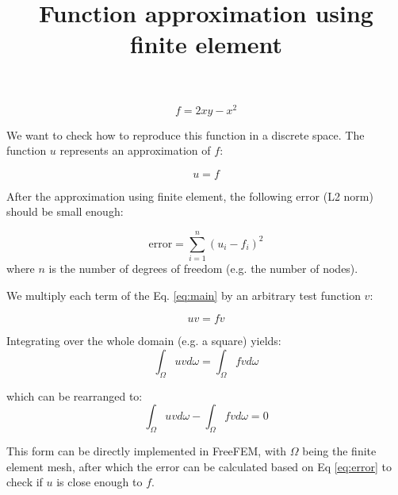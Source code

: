 \documentclass[12pt,a4paper]{article}
\title{Function approximation using finite element}
\date{}
\begin{document}
\maketitle

\onehalfspacing

\begin{equation} 
f=2xy-x^2
\end{equation}

\noindent We want to check how to reproduce this function in a discrete space. The function $u$ represents an approximation of $f$: 

\begin{equation} \label{eq:main}
u=f
\end{equation}

\noindent After the approximation using finite element, the following error (L2 norm) should be small enough:

\begin{equation} \label{eq:error}
\textrm{error}=\sum_{i=1}^n (u_i-f_i)^2
\end{equation}
where $n$ is the number of degrees of freedom (e.g. the number of nodes).

\noindent We multiply each term of the Eq. \ref{eq:main} by an arbitrary test function $v$:

\begin{equation}
uv=fv
\end{equation}

\noindent Integrating over the whole domain (e.g. a square) yields:
\begin{equation} 
\int_{\Omega} u v d \omega=\int_{\Omega} f v d \omega
\end{equation}

\noindent which can be rearranged to:
\begin{equation} 
\int_{\Omega} u v d \omega-\int_{\Omega} f v d \omega=0
\end{equation}

\noindent This form can be directly implemented in FreeFEM, with $\Omega$ being the finite element mesh, after which the error can be calculated based on Eq \ref{eq:error} to check if $u$ is close enough to $f$.
\end{document}
